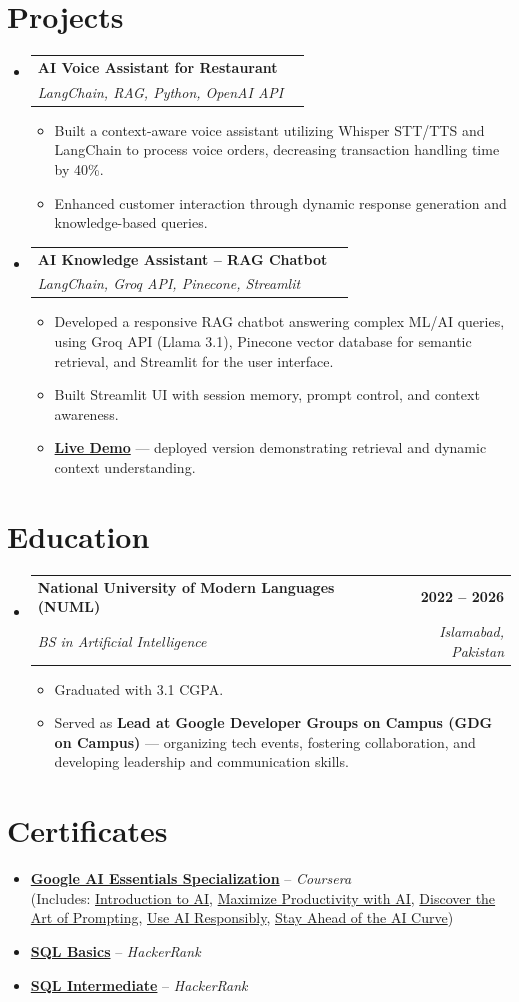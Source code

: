 \documentclass[letterpaper,10.5pt]{article}
\makeatletter
\newcommand{\resumeItem}[1]{\item \small{#1}}
\newcommand{\resumeSubheading}[4]{
  \vspace{-2pt}\item
    \begin{tabular*}{1.0\textwidth}[t]{l@{\extracolsep{\fill}}r}
      \textbf{#1} & \textbf{\small #2} \\
      \textit{\small#3} & \textit{\small #4} \\
    \end{tabular*}\vspace{-7pt}
}
\newcommand{\resumeSubHeadingListStart}{\begin{itemize}[leftmargin=0.0in, label={}]}
\newcommand{\resumeSubHeadingListEnd}{\end{itemize}}
\newcommand{\resumeItemListStart}{\begin{itemize}[leftmargin=0.15in, label=\textbullet]}
\newcommand{\resumeItemListEnd}{\end{itemize}\vspace{-5pt}}
\makeatother
\begin{document}
\section{Projects}
\resumeSubHeadingListStart
  \resumeSubheading
    {AI Voice Assistant for Restaurant}{}{LangChain, RAG, Python, OpenAI API}{}
    \resumeItemListStart
        \resumeItem{Built a context-aware voice assistant utilizing Whisper STT/TTS and LangChain to process voice orders, decreasing transaction handling time by 40\%.}
        \resumeItem{Enhanced customer interaction through dynamic response generation and knowledge-based queries.}
    \resumeItemListEnd

  \resumeSubheading
    {AI Knowledge Assistant – RAG Chatbot}{}{LangChain, Groq API, Pinecone, Streamlit}{}
    \resumeItemListStart
        \resumeItem{Developed a responsive RAG chatbot answering complex ML/AI queries, using Groq API (Llama 3.1), Pinecone vector database for semantic retrieval, and Streamlit for the user interface.}
        \resumeItem{Built Streamlit UI with session memory, prompt control, and context awareness.}
        \resumeItem{\href{https://ai-knowledge-assist.streamlit.app/}{\textbf{Live Demo}} — deployed version demonstrating retrieval and dynamic context understanding.}
    \resumeItemListEnd
\resumeSubHeadingListEnd
\section{Education}
\resumeSubHeadingListStart
  \resumeSubheading
    {National University of Modern Languages (NUML)}{2022 – 2026}
    {BS in Artificial Intelligence}{Islamabad, Pakistan}
    \resumeItemListStart
      \resumeItem{Graduated with 3.1 CGPA.}
      \resumeItem{Served as \textbf{Lead at Google Developer Groups on Campus (GDG on Campus)} — organizing tech events, fostering collaboration, and developing leadership and communication skills.}
    \resumeItemListEnd
\resumeSubHeadingListEnd
\section{Certificates}
\resumeItemListStart
    \resumeItem{\href{https://www.credly.com/badges/f9f24684-43a5-44b3-bea7-18a2e0e5a964/linked_in_profile}{\textbf{Google AI Essentials Specialization}} -- \textit{Coursera} \\
    (Includes: \href{https://www.coursera.org/account/accomplishments/verify/5FXXDEERNVVX}{Introduction to AI}, \href{https://www.coursera.org/account/accomplishments/verify/EW1GFDRKYZSX}{Maximize Productivity with AI}, \href{https://www.coursera.org/account/accomplishments/verify/6GOSUBVQE2NW}{Discover the Art of Prompting}, \href{https://www.coursera.org/account/accomplishments/verify/3C6HLXF1PPDD}{Use AI Responsibly}, \href{https://www.coursera.org/account/accomplishments/verify/D9GU8GAOJ66Y}{Stay Ahead of the AI Curve})}
    \resumeItem{\href{https://www.hackerrank.com/certificates/398a9b1cc707}{\textbf{SQL Basics}} -- \textit{HackerRank}}
    \resumeItem{\href{https://www.hackerrank.com/certificates/02a29a077a6b}{\textbf{SQL Intermediate}} -- \textit{HackerRank}}
\resumeItemListEnd
\end{document}
